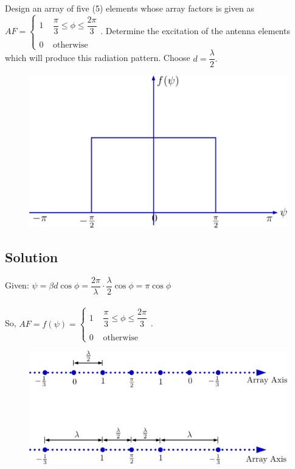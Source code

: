 \begin{exmp}
Design an array of five (5) elements whose array factors is given as\\
$ AF = \begin{cases}
1 \; \; \; \; \dfrac{\pi}{3} \leq \phi \leq \dfrac{2\pi}{3}\\
\\
0 \; \; \; \; \text{otherwise}
\end{cases}$.
Determine the excitation of the antenna elements which will produce this radiation pattern. Choose $d = \dfrac{\lambda}{2}.$
\begin{figure}[h]
\centering
\includegraphics[width=1\linewidth]{"./graphics/img59_5"}
\label{fig:fig-5}
\end{figure}

\subsection{\centering Solution}
Given: $\psi = \beta d \cos\phi = \dfrac{2\pi}{\lambda} \cdot \dfrac{\lambda}{2} \cos\phi = \pi\cos\phi$\\
\\
So, $AF = f(\psi) =\begin{cases}
1 \; \; \; \; \dfrac{\pi}{3} \leq \phi \leq \dfrac{2\pi}{3}\\
\\
0 \; \; \; \; \text{otherwise}
\end{cases}$. 
\begin{figure}[h]
\centering
\includegraphics[width=1\linewidth]{"./graphics/img59_6"}
\label{fig:fig-6}
\end{figure}


\end{exmp}
